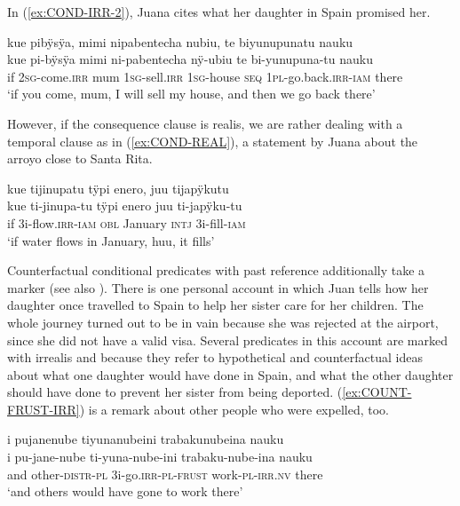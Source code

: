 In (\ref{ex:COND-IRR-2}), Juana cites what her daughter in Spain promised her.

\ea\label{ex:COND-IRR-2}
\begingl
\glpreamble kue pibÿsÿa, mimi nipabentecha nubiu, te biyunupunatu nauku\\
\gla kue pi-bÿsÿa mimi ni-pabentecha nÿ-ubiu te bi-yunupuna-tu nauku\\
\glb if 2\textsc{sg}-come.\textsc{irr} mum 1\textsc{sg}-sell.\textsc{irr} 1\textsc{sg}-house \textsc{seq} 1\textsc{pl}-go.back.\textsc{irr}-\textsc{iam} there\\
\glft ‘if you come, mum, I will sell my house, and then we go back there’
\endgl
 \trailingcitation{[jxx-p110923l-1.432]}
\xe
{}

However, if the consequence clause is realis, we are rather dealing with a temporal clause as in (\ref{ex:COND-REAL}), a statement by Juana about the arroyo close to Santa Rita.%

\ea\label{ex:COND-REAL}
\begingl
\glpreamble kue tijinupatu tÿpi enero, juu tijapÿkutu\\
\gla kue ti-jinupa-tu tÿpi enero juu ti-japÿku-tu\\
\glb if 3i-flow.\textsc{irr}-\textsc{iam} \textsc{obl} January \textsc{intj} 3i-fill-\textsc{iam}\\
\glft ‘if water flows in January, huu, it fills’
\endgl
 \trailingcitation{[jxx-a120516l-a.572-573]}
\xe
{}

Counterfactual conditional predicates with past reference additionally take a  mark\-er (see also ). There is one personal account in which Juan tells how her daughter once travelled to Spain to help her sister care for her children. The whole journey turned out to be in vain because she was rejected at the airport, since she did not have a valid visa. Several predicates in this account are marked with irrealis and  because they refer to hypothetical and counterfactual ideas about what one daughter would have done in Spain, and what the other daughter should have done to prevent her sister from being deported. (\ref{ex:COUNT-FRUST-IRR}) is a remark about other people who were expelled, too.

\ea\label{ex:COUNT-FRUST-IRR}
\begingl 
\glpreamble i pujanenube tiyunanubeini trabakunubeina nauku \\
\gla i pu-jane-nube ti-yuna-nube-ini trabaku-nube-ina nauku \\ 
\glb and other-\textsc{distr}-\textsc{pl} 3i-go.\textsc{irr}-\textsc{pl}-\textsc{frust} work-\textsc{pl}-\textsc{irr.nv} there\\ 
\glft ‘and others would have gone to work there’\\ 
\endgl
 \trailingcitation{[jxx-p120430l-1.206]}
\xe
{}

